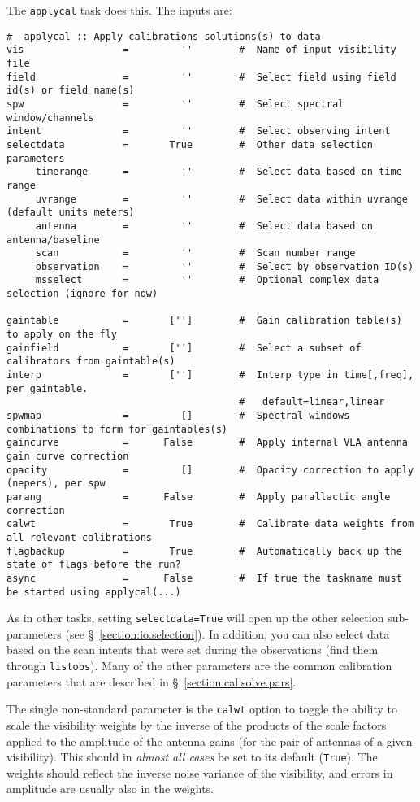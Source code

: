 The {\tt applycal} task does this.  The inputs are:
\small
\begin{verbatim}
#  applycal :: Apply calibrations solutions(s) to data
vis                 =         ''        #  Name of input visibility file
field               =         ''        #  Select field using field id(s) or field name(s)
spw                 =         ''        #  Select spectral window/channels
intent              =         ''        #  Select observing intent
selectdata          =       True        #  Other data selection parameters
     timerange      =         ''        #  Select data based on time range
     uvrange        =         ''        #  Select data within uvrange (default units meters)
     antenna        =         ''        #  Select data based on antenna/baseline
     scan           =         ''        #  Scan number range
     observation    =         ''        #  Select by observation ID(s)
     msselect       =         ''        #  Optional complex data selection (ignore for now)

gaintable           =       ['']        #  Gain calibration table(s) to apply on the fly
gainfield           =       ['']        #  Select a subset of calibrators from gaintable(s)
interp              =       ['']        #  Interp type in time[,freq], per gaintable.
                                        #   default=linear,linear
spwmap              =         []        #  Spectral windows combinations to form for gaintables(s)
gaincurve           =      False        #  Apply internal VLA antenna gain curve correction
opacity             =         []        #  Opacity correction to apply (nepers), per spw
parang              =      False        #  Apply parallactic angle correction
calwt               =       True        #  Calibrate data weights from all relevant calibrations
flagbackup          =       True        #  Automatically back up the state of flags before the run?
async               =      False        #  If true the taskname must be started using applycal(...)
\end{verbatim}
\normalsize
As in other tasks, setting {\tt selectdata=True} will open up the
other selection sub-parameters (see
\S~\ref{section:io.selection}). In addition, you can also select data
based on the scan intents that were set during the observations (find
them through {\tt listobs}). 
Many of the other parameters are the common calibration parameters
that are described in \S~\ref{section:cal.solve.pars}.

The single non-standard parameter is the {\tt calwt} option to toggle
the ability to scale the visibility weights by the inverse of the 
products of the scale factors applied to the amplitude of the antenna
gains (for the pair of antennas of a given visibility).  
This should in {\em almost all cases} be set to its default ({\tt True}).
The weights should reflect the inverse noise variance of the
visibility, and errors in amplitude are usually also in the weights.


